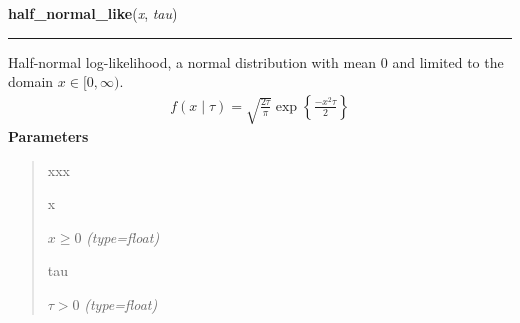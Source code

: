 \hspace{.8\funcindent}\begin{boxedminipage}{\funcwidth}

    \raggedright \textbf{half\_normal\_like}(\textit{x}, \textit{tau})

    \vspace{-1.5ex}

    \rule{\textwidth}{1pt}
\setlength{\parskip}{2ex}

Half-normal log-likelihood, a normal distribution with mean 0 and limited
to the domain $x \in [0, \infty)$.
\begin{equation*}\begin{split}f(x \mid \tau) = \sqrt{\frac{2\tau}{\pi}}\exp\left\{ {\frac{-x^2 \tau}{2}}\right\}\end{split}\end{equation*}\setlength{\parskip}{1ex}
      \textbf{Parameters}
      \vspace{-1ex}

      \begin{quote}
        \begin{Ventry}{xxx}

          \item[x]


$x \ge 0$
            {\it (type=float)}

          \item[tau]


$\tau > 0$
            {\it (type=float)}

        \end{Ventry}

      \end{quote}

    \end{boxedminipage}

    \label{pymc:distributions:hypergeometric_like}

    \vspace{0.5ex}

